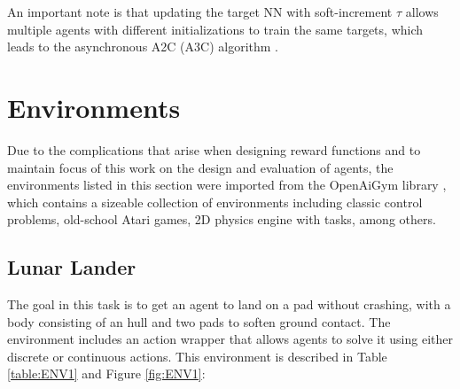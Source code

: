 \documentclass[journal]{IEEEtran}
\begin{document}
		An important note is that updating the target NN with soft-increment $\tau$ allows multiple agents with different initializations to train the same targets, which leads to the asynchronous A2C (A3C) algorithm \cite{babaeizadeh2016ga3c}.

\section{Environments}

	Due to the complications that arise when designing reward functions \cite{Egg_Survey} and to maintain focus of this work on the design and evaluation of agents, the environments listed in this section were imported from the OpenAiGym library \cite{OpenAiGym}, which contains a sizeable collection of environments including classic control problems, old-school Atari games, 2D physics engine with tasks, among others.

	\subsection{Lunar Lander}
	
		The goal in this task is to get an agent to land on a pad without crashing, with a body consisting of an hull and two pads to soften ground contact. The environment includes an action wrapper that allows agents to solve it using either discrete or continuous actions. This environment is described in Table \ref{table:ENV1} and Figure \ref{fig:ENV1}:
	
\end{document}
